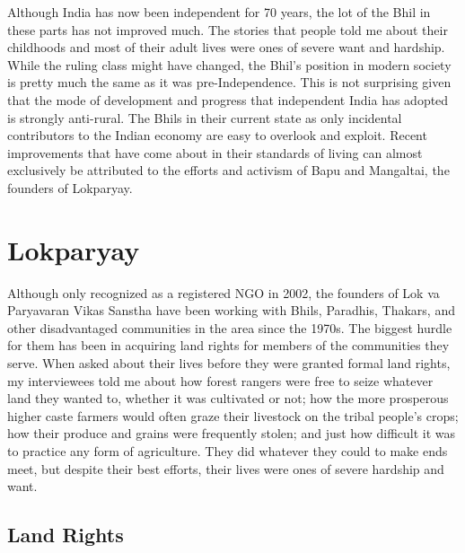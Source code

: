 \documentclass[report.tex]{subfiles}
\begin{document}
Although India has now been independent for 70 years, the lot of the Bhil in these parts has not improved much. The stories that people told me about their childhoods and most of their adult lives were ones of severe want and hardship. While the ruling class might have changed, the Bhil's position in modern society is pretty much the same as it was pre-Independence. This is not surprising given that the mode of development and progress that independent India has adopted is strongly anti-rural. The Bhils in their current state as only incidental contributors to the Indian economy are easy to overlook and exploit. Recent improvements that have come about in their standards of living can almost exclusively be attributed to the efforts and activism of Bapu and Mangaltai, the founders of Lokparyay.

\newpage

\section{Lokparyay}

Although only recognized as a registered NGO in 2002, the founders of Lok va Paryavaran Vikas Sanstha have been working with Bhils, Paradhis, Thakars, and other disadvantaged communities in the area since the 1970s. The biggest hurdle for them has been in acquiring land rights for members of the communities they serve. When asked about their lives before they were granted formal land rights, my interviewees told me about how forest rangers were free to seize whatever land they wanted to, whether it was cultivated or not; how the more prosperous higher caste farmers would often graze their livestock on the tribal people's crops; how their produce and grains were frequently stolen; and just how difficult it was to practice any form of agriculture. They did whatever they could to make ends meet, but despite their best efforts, their lives were ones of severe hardship and want.

\subsection{Land Rights}
\end{document}
